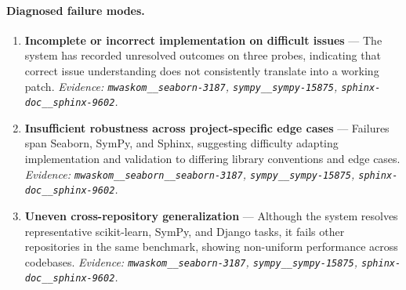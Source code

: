 \paragraph{Diagnosed failure modes.}\begin{enumerate}\itemsep1pt
\item \textbf{Incomplete or incorrect implementation on difficult issues} --- The system has recorded unresolved outcomes on three probes, indicating that correct issue understanding does not consistently translate into a working patch. \emph{Evidence: \texttt{mwaskom\_\_seaborn-3187}, \texttt{sympy\_\_sympy-15875}, \texttt{sphinx-doc\_\_sphinx-9602}.}
\item \textbf{Insufficient robustness across project-specific edge cases} --- Failures span Seaborn, SymPy, and Sphinx, suggesting difficulty adapting implementation and validation to differing library conventions and edge cases. \emph{Evidence: \texttt{mwaskom\_\_seaborn\_\_seaborn-3187}, \texttt{sympy\_\_sympy-15875}, \texttt{sphinx-doc\_\_sphinx-9602}.}
\item \textbf{Uneven cross-repository generalization} --- Although the system resolves representative scikit-learn, SymPy, and Django tasks, it fails other repositories in the same benchmark, showing non-uniform performance across codebases. \emph{Evidence: \texttt{mwaskom\_\_seaborn-3187}, \texttt{sympy\_\_sympy-15875}, \texttt{sphinx-doc\_\_sphinx-9602}.}
\end{enumerate}
